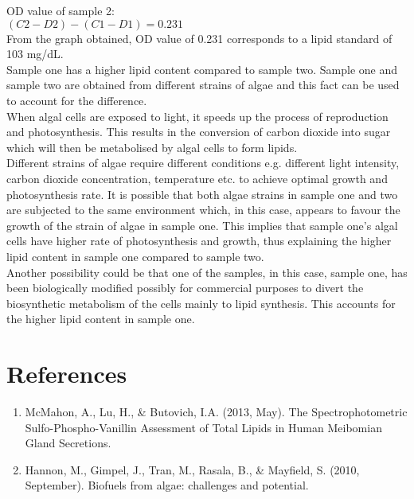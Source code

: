 \documentclass[11.5pt,a4paper]{IEEEtran}
\begin{document}
    OD value of sample 2: \\
    
    $(C2-D2)-(C1-D1) = 0.231$ \\
    
    From the graph obtained, OD value of 0.231 corresponds to a lipid standard of 103 mg/dL. \\
    
    Sample one has a higher lipid content compared to sample two. Sample one and sample two are obtained from different strains of algae and this fact can be used to account for the difference. \\
    
    When algal cells are exposed to light, it speeds up the process of reproduction and photosynthesis. This results in the conversion of carbon dioxide into sugar which will then be metabolised by algal cells to form lipids. \\
    
    Different strains of algae require different conditions e.g. different light intensity, carbon dioxide concentration, temperature etc. to achieve optimal growth and photosynthesis rate. It is possible that both algae strains in sample one and two are subjected to the same environment which, in this case, appears to favour the growth of the strain of algae in sample one. This implies that sample one's algal cells have  higher rate of photosynthesis and growth, thus explaining the higher lipid content in sample one compared to sample two. \\
    
    Another possibility could be that one of the samples, in this case, sample one, has been biologically modified possibly for commercial purposes to divert the biosynthetic metabolism of the cells mainly to lipid synthesis. This accounts for the higher lipid content in sample one.
    
    \section{References}
    \begin{enumerate}
    	\item McMahon, A., Lu, H., \& Butovich, I.A. (2013, May). The Spectrophotometric Sulfo-Phospho-Vanillin Assessment of Total Lipids in Human Meibomian Gland Secretions.
    	\item Hannon, M., Gimpel, J., Tran, M., Rasala, B., \& Mayfield, S. (2010, September). Biofuels from algae: challenges and potential.
    \end{enumerate}
\end{document}
